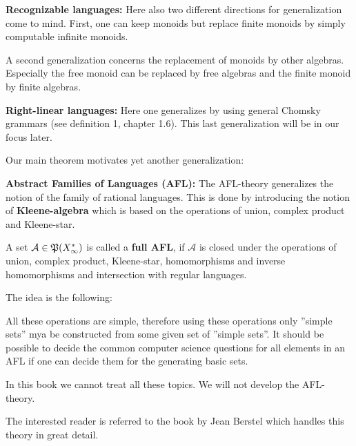 {\bf Recognizable languages:} Here also two different directions for generalization
come to mind. First, one can keep monoids but replace finite monoids by simply
computable infinite monoids.

A second generalization concerns the replacement of monoids by other algebras.
Especially the free monoid can be replaced by free algebras and the finite
monoid by finite algebras.

{\bf Right-linear languages:} Here one generalizes by using general Chomsky
grammars (see definition 1, chapter 1.6). This last generalization will be in
our focus later.

Our main theorem motivates yet another generalization:

{\bf Abstract Families of Languages (AFL):} The AFL-theory generalizes the
notion of the family of rational languages. This is done by introducing the
notion of {\bf Kleene-algebra} which is based on the operations of union,
complex product and Kleene-star.

A set $\mathcal{A} \in \mathfrak{P}({X_\infty^*})$ is called a {\bf full AFL}, if
$\mathcal{A}$ is closed under the operations of union, complex product,
Kleene-star, homomorphisms and inverse homomorphisms and intersection with
regular languages.

The idea is the following:

All these operations are simple, therefore using these operations only ''simple
sets'' mya be constructed from some given set of ''simple sets''. It should be
possible to decide the common computer science questions for all elements in an
AFL if one can decide them for the generating basic sets.

In this book we cannot treat all these topics. We will not develop the
AFL-theory.

The interested reader is referred to the book by Jean Berstel \cite{Berstel79}
which handles this theory in great detail.

